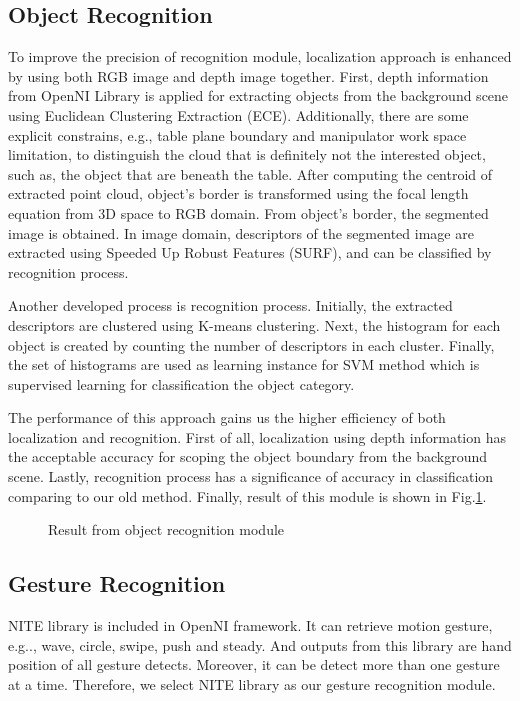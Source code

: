 \documentclass{llncs}
\begin{document}
\subsection{Object Recognition}
    
To improve the precision of recognition module, localization approach is enhanced by using both RGB image and depth image together. First, depth information from OpenNI Library is applied for extracting objects from the background scene using Euclidean Clustering Extraction (ECE)\cite{ece}\cite{rudu.thesis}. Additionally, there are some explicit constrains, e.g., table plane boundary and manipulator work space limitation, to distinguish the cloud that is definitely not the interested object, such as, the object that are beneath the table. After computing the centroid of extracted point cloud, object's border is transformed using the focal length equation from 3D space to RGB domain. From object's border, the segmented image is obtained. In image domain, descriptors of the segmented image are extracted using Speeded Up Robust Features (SURF), and can be classified by recognition process.

Another developed process is recognition process. Initially, the extracted descriptors are clustered using K-means clustering. Next, the histogram for each object is created by counting the number of descriptors in each cluster. Finally, the set of histograms are used as learning instance for SVM method which is supervised learning for classification the object category\cite{obj_rec}.

The performance of this approach gains us the higher efficiency of both localization and recognition. First of all, localization using depth information has the acceptable accuracy for scoping the object boundary from the background scene. Lastly, recognition process has a significance of accuracy in classification comparing to our old method. Finally, result of this module is shown in Fig.\ref{fig:object_recog}.

\begin{figure}
\centering
\caption{Result from object recognition module}
\label{fig:object_recog}
\end{figure}

\subsection{Gesture Recognition}

NITE library is included in OpenNI framework. It can retrieve motion gesture, e.g.., wave, circle, swipe, push and steady. And outputs from this library are hand position of all gesture detects. Moreover, it can be detect more than one gesture at a time. Therefore, we select NITE library as our gesture recognition module.
\end{document}
